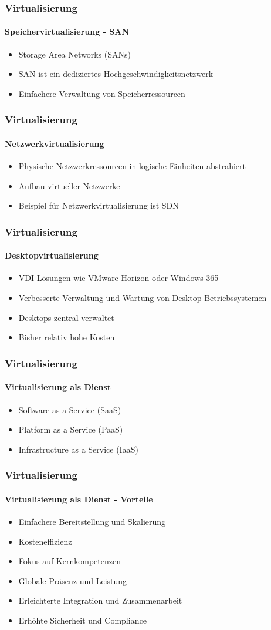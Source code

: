 \begin{frame}
  \frametitle{Virtualisierung}
  \framesubtitle{Speichervirtualisierung - SAN}
  \begin{itemize}
    \item Storage Area Networks (SANs)
    \item SAN ist ein dediziertes Hochgeschwindigkeitsnetzwerk
    \item Einfachere Verwaltung von Speicherressourcen 
  \end{itemize}
\end{frame}


\begin{frame}
  \frametitle{Virtualisierung}
  \framesubtitle{Netzwerkvirtualisierung}
  \begin{itemize}
    \item Physische Netzwerkressourcen in logische Einheiten abstrahiert
    \item Aufbau virtueller Netzwerke
    \item Beispiel für Netzwerkvirtualisierung ist SDN
  \end{itemize}
\end{frame}

\begin{frame}
  \frametitle{Virtualisierung}
  \framesubtitle{Desktopvirtualisierung}
  \begin{itemize}
    \item VDI-Lösungen wie VMware Horizon oder Windows 365
    \item Verbesserte Verwaltung und Wartung von Desktop-Betriebssystemen
    \item Desktops zentral verwaltet
    \item Bisher relativ hohe Kosten
  \end{itemize}
\end{frame}

\begin{frame}
  \frametitle{Virtualisierung}
  \framesubtitle{Virtualisierung als Dienst}
  \begin{itemize}
    \item Software as a Service (SaaS)
    \item Platform as a Service (PaaS)
    \item Infrastructure as a Service (IaaS)
  \end{itemize}
\end{frame}

\begin{frame}
  \frametitle{Virtualisierung}
  \framesubtitle{Virtualisierung als Dienst - Vorteile}
  \begin{itemize}
    \item Einfachere Bereitstellung und Skalierung
    \item Kosteneffizienz
    \item Fokus auf Kernkompetenzen
    \item Globale Präsenz und Leistung
    \item Erleichterte Integration und Zusammenarbeit
    \item Erhöhte Sicherheit und Compliance
  \end{itemize}
\end{frame}

